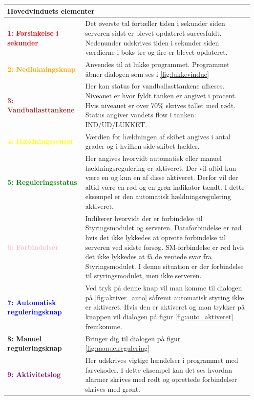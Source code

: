 \begin{table}[H]
\begin{tabular}{l p{12.5cm}}
\multicolumn{2}{l}{Hovedvinduets elementer} \\
\hline
\textcolor{red}{\textbf{1: Forsinkelse i sekunder}}
&Det øverste tal fortæller tiden i sekunder siden serveren sidst er blevet opdateret succesfuldt.
Nedenunder udskrives tiden i sekunder siden værdierne i boks tre og fire er blevet opdateret.\\

\textcolor{Orange}{\textbf{2: Nedlukningsknap}}
&Anvendes til at lukke programmet. Programmet åbner dialogen som ses i \ref{fig:lukkevindue}\\

\textcolor{brown}{\textbf{3: Vandballasttankene}}
&Her kan status for vandballasttankene aflæses. Niveauet er hvor fyldt tanken er angivet i procent. Hvis niveauet er over 70\% skrives tallet med rødt.
Status angiver vandets flow i tanken: IND/UD/LUKKET.\\

\textcolor{yellow}{\textbf{4: Hældningssensor}}
&Værdien for hældningen af skibet angives i antal grader og i hvilken side skibet hælder.\\

\textcolor{green}{\textbf{5: Reguleringsstatus}}
&Her angives hvorvidt automatisk eller manuel hældningsregulering er aktiveret. Der vil altid kun være en og kun en af disse aktiveret. Derfor vil der altid være en rød og en grøn indikator tændt. I dette eksempel er den automatisk hældningsregulering aktiveret.\\
\textcolor{pink}{\textbf{6: Forbindelser}}
&Indikerer hvorvidt der er forbindelse til Styringsmodulet og serveren. Dataforbindelse er rød hvis det ikke lykkedes at oprette forbindelse til serveren ved sidste forsøg.
SM-forbindelse er rød hvis det ikke lykkedes at få de ventede svar fra Styringsmodulet.
I denne situation er der forbindelse til styringsmodulet, men ikke serveren.\\

\textcolor{blue}{\textbf{7: Automatisk reguleringsknap}}
&Ved tryk på denne knap vil man komme til dialogen på \ref{fig:aktiver_auto} såfremt automatisk styring ikke er aktiveret. Hvis den er aktiveret og man trykker på knappen vil dialogen på figur \ref{fig:auto_aktiveret} fremkomme.\\

\textcolor{BlueGreen}{\textbf{8: Manuel reguleringsknap}}
&Bringer dig til dialogen på figur \ref{fig:manuelregulering}\\

\textcolor{purple}{\textbf{9: Aktivitetslog}}
&Her udskrives vigtige hændelser i programmet med farvekoder. I dette eksempel kan det ses hvordan alarmer skrives med rødt og oprettede forbindelser skrives med grønt.\\

\end{tabular}
\end{table}


